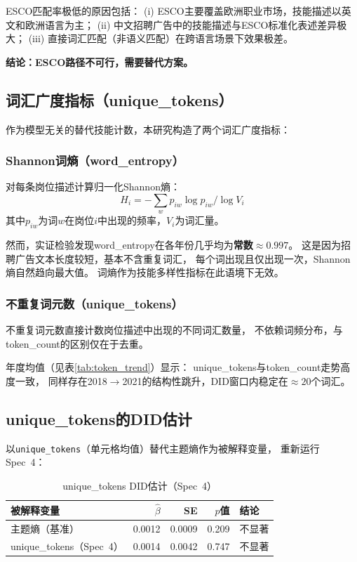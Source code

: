 \documentclass[12pt,a4paper]{ctexart}
\begin{document}
ESCO匹配率极低的原因包括：
(i) ESCO主要覆盖欧洲职业市场，技能描述以英文和欧洲语言为主；
(ii) 中文招聘广告中的技能描述与ESCO标准化表述差异极大；
(iii) 直接词汇匹配（非语义匹配）在跨语言场景下效果极差。

\textbf{结论：ESCO路径不可行，需要替代方案。}

\subsection{词汇广度指标（unique\_tokens）}

作为模型无关的替代技能计数，本研究构造了两个词汇广度指标：

\subsubsection{Shannon词熵（word\_entropy）}

对每条岗位描述计算归一化Shannon熵：
\[
H_i = -\sum_{w} p_{iw} \log p_{iw} / \log V_i
\]
其中$p_{iw}$为词$w$在岗位$i$中出现的频率，$V_i$为词汇量。

然而，实证检验发现word\_entropy在各年份几乎均为\textbf{常数$\approx 0.997$}。
这是因为招聘广告文本长度较短，基本不含重复词汇，
每个词出现且仅出现一次，Shannon熵自然趋向最大值。
词熵作为技能多样性指标在此语境下无效。

\subsubsection{不重复词元数（unique\_tokens）}

不重复词元数直接计数岗位描述中出现的不同词汇数量，
不依赖词频分布，与token\_count的区别仅在于去重。

年度均值（见表\ref{tab:token_trend}）显示：
unique\_tokens与token\_count走势高度一致，
同样存在2018$\to$2021的结构性跳升，DID窗口内稳定在$\approx 20$个词汇。

\subsection{unique\_tokens的DID估计}

以\texttt{unique\_tokens}（单元格均值）替代主题熵作为被解释变量，
重新运行Spec~4：

\begin{table}[h!]
\centering
\caption{unique\_tokens DID估计（Spec~4）}
\label{tab:unique_tokens_did}
\begin{tabular}{lrrrl}
\toprule
被解释变量 & $\hat{\beta}$ & SE & $p$值 & 结论 \\
\midrule
主题熵（基准） & 0.0012 & 0.0009 & 0.209 & 不显著 \\
unique\_tokens（Spec~4） & 0.0014 & 0.0042 & 0.747 & 不显著 \\
\bottomrule
\end{tabular}
\end{table}
\end{document}
